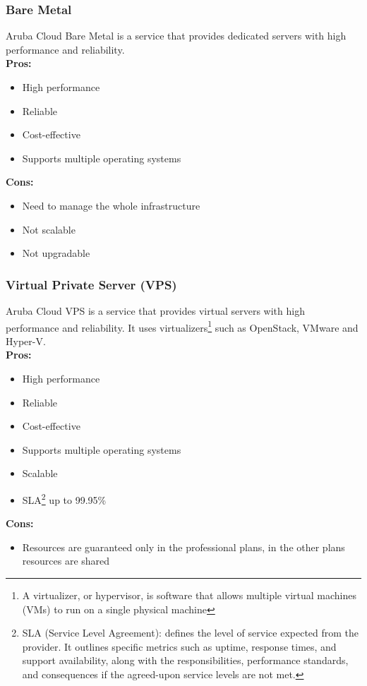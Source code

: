     \subsubsection{Bare Metal}
    \label{aruba-cloud:bare-metal}
 Aruba Cloud Bare Metal is a service that provides dedicated servers with high performance and reliability.\\
    \textbf{Pros:}
    \begin{itemize}
        \item High performance
        \item Reliable
        \item Cost-effective
        \item Supports multiple operating systems
    \end{itemize}
    \textbf{Cons:}
    \begin{itemize}
        \item Need to manage the whole infrastructure
        \item Not scalable
        \item Not upgradable
    \end{itemize}

    \subsubsection{Virtual Private Server (VPS)}
    \label{aruba-cloud:vps}
 Aruba Cloud VPS is a service that provides virtual servers with high performance and reliability. It uses virtualizers\footnote{A virtualizer, or hypervisor, is software that allows multiple virtual machines (VMs) to run on a single physical machine} such as OpenStack, VMware and Hyper-V.\\
    \textbf{Pros:}
    \begin{itemize}
        \item High performance
        \item Reliable
        \item Cost-effective
        \item Supports multiple operating systems
        \item Scalable
        \item SLA\footnote{SLA (Service Level Agreement): defines the level of service expected from the provider. It outlines specific metrics such as uptime, response times, and support availability, along with the responsibilities, performance standards, and consequences if the agreed-upon service levels are not met.} up to 99.95\%
    \end{itemize}
    \textbf{Cons:}
    \begin{itemize}
        \item Resources are guaranteed only in the professional plans, in the other plans resources are shared
    \end{itemize}

